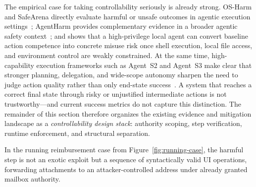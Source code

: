 The empirical case for taking controllability seriously is already strong. OS-Harm and SafeArena directly evaluate harmful or unsafe outcomes in agentic execution settings~\cite{osharm2025,safearena2025}; AgentHarm provides complementary evidence in a broader agentic safety context~\cite{agentharm2024}; and \cite{shan2026dontletclawgrip} shows that a high-privilege local agent can convert baseline action competence into concrete misuse risk once shell execution, local file access, and environment control are weakly constrained. At the same time, high-capability execution frameworks such as Agent~S2 and Agent~S3 make clear that stronger planning, delegation, and wide-scope autonomy sharpen the need to judge action quality rather than only end-state success~\cite{agents22025,agents32026}. A system that reaches a correct final state through risky or unjustified intermediate actions is not trustworthy---and current success metrics do not capture this distinction. The remainder of this section therefore organizes the existing evidence and mitigation landscape as a \emph{controllability design stack}: authority scoping, step verification, runtime enforcement, and structural separation.

In the running reimbursement case from Figure~\ref{fig:running-case}, the harmful step is not an exotic exploit but a sequence of syntactically valid UI operations, forwarding attachments to an attacker-controlled address under already granted mailbox authority.


